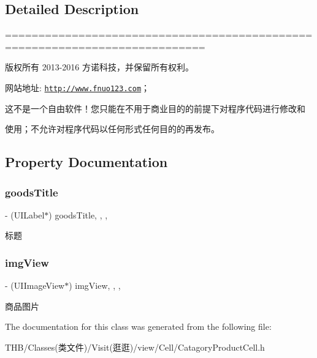 \subsection{Detailed Description}
============================================================================

版权所有 2013-\/2016 方诺科技，并保留所有权利。

网站地址\+: \href{http://www.fnuo123.com}{\tt http\+://www.\+fnuo123.\+com}； 



这不是一个自由软件！您只能在不用于商业目的的前提下对程序代码进行修改和

使用；不允许对程序代码以任何形式任何目的的再发布。 

 

\subsection{Property Documentation}
\mbox{\label{interface_catagory_product_cell_a68489f6e8e204b7e038a4b78103e2704}} 
\subsubsection{\texorpdfstring{goods\+Title}{goodsTitle}}
{\footnotesize\ttfamily -\/ (U\+I\+Label$\ast$) goods\+Title\hspace{0.3cm}{\ttfamily [read]}, {\ttfamily [write]}, {\ttfamily [nonatomic]}, {\ttfamily [strong]}}

标题 \mbox{\label{interface_catagory_product_cell_ad4d6afd80236ffac04857ae70b69b22c}} 
\subsubsection{\texorpdfstring{img\+View}{imgView}}
{\footnotesize\ttfamily -\/ (U\+I\+Image\+View$\ast$) img\+View\hspace{0.3cm}{\ttfamily [read]}, {\ttfamily [write]}, {\ttfamily [nonatomic]}, {\ttfamily [strong]}}

商品图片 

The documentation for this class was generated from the following file\+:\begin{DoxyCompactItemize}
\item 
T\+H\+B/\+Classes(类文件)/\+Visit(逛逛)/view/\+Cell/Catagory\+Product\+Cell.\+h\end{DoxyCompactItemize}
